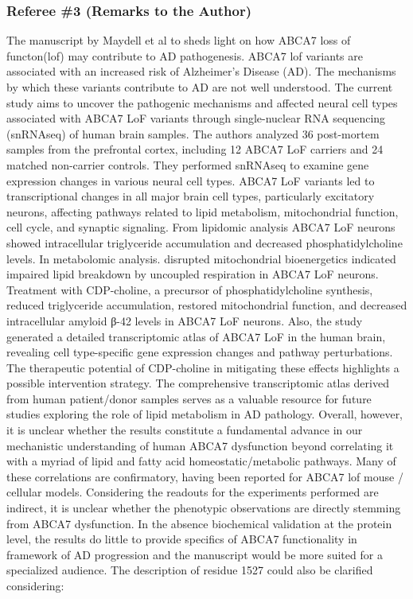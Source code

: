 \subsubsection{Referee \#3 (Remarks to the Author)}
The manuscript by Maydell et al to sheds light on how ABCA7 loss of functon(lof) may contribute to AD pathogenesis. ABCA7 lof variants are associated with an increased risk of Alzheimer's Disease (AD). The mechanisms by which these variants contribute to AD are not well understood. The current study aims to uncover the pathogenic mechanisms and affected neural cell types associated with ABCA7 LoF variants through single-nuclear RNA sequencing (snRNAseq) of human brain samples. The authors analyzed 36 post-mortem samples from the prefrontal cortex, including 12 ABCA7 LoF carriers and 24 matched non-carrier controls. They performed snRNAseq to examine gene expression changes in various neural cell types. ABCA7 LoF variants led to transcriptional changes in all major brain cell types, particularly excitatory neurons, affecting pathways related to lipid metabolism, mitochondrial function, cell cycle, and synaptic signaling. From lipidomic analysis ABCA7 LoF neurons showed intracellular triglyceride accumulation and decreased phosphatidylcholine levels. In metabolomic analysis. disrupted mitochondrial bioenergetics indicated impaired lipid breakdown by uncoupled respiration in ABCA7 LoF neurons. Treatment with CDP-choline, a precursor of phosphatidylcholine synthesis, reduced triglyceride accumulation, restored mitochondrial function, and decreased intracellular amyloid β-42 levels in ABCA7 LoF neurons. Also, the study generated a detailed transcriptomic atlas of ABCA7 LoF in the human brain, revealing cell type-specific gene expression changes and pathway perturbations. The therapeutic potential of CDP-choline in mitigating these effects highlights a possible intervention strategy. The comprehensive transcriptomic atlas derived from human patient/donor samples serves as a valuable resource for future studies exploring the role of lipid metabolism in AD pathology.
Overall, however, it is unclear whether the results constitute a fundamental advance in our mechanistic understanding of human ABCA7 dysfunction beyond correlating it with a myriad of lipid and fatty acid homeostatic/metabolic pathways. Many of these correlations are confirmatory, having been reported for ABCA7 lof mouse / cellular models. Considering the readouts for the experiments performed are indirect, it is unclear whether the phenotypic observations are directly stemming from ABCA7 dysfunction. In the absence biochemical validation at the protein level, the results do little to provide specifics of ABCA7 functionality in framework of AD progression and the manuscript would be more suited for a specialized audience. The description of residue 1527 could also be clarified considering:

